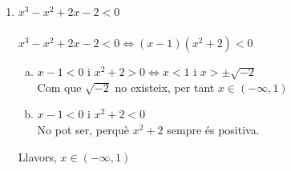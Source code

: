 \begin{enumerate}[2)]
\item $x^3-x^2+2x-2<0$ \\ \\
$x^3-x^2+2x-2<0 \Longleftrightarrow (x-1)(x^2+2)<0$
\begin{enumerate}[a)]
\item $x-1<0$ i $x^2+2>0\Longleftrightarrow x<1$ i $x>\pm \sqrt{-2}$ \\
Com que $\sqrt{-2}$ no existeix, per tant $x\in (-\infty, 1)$
\item $x-1<0$ i $x^2+2<0$ \\
No pot ser, perquè $x^2+2$ sempre és positiva.
\end{enumerate}
Llavors, $x\in (-\infty, 1)$\\
\end{enumerate}